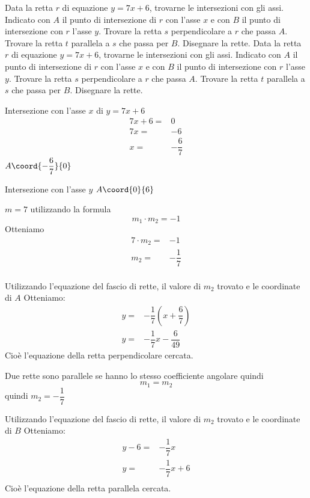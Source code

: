 \begin{exercise}
Data la retta $r$ di equazione $y=7x+6$, trovarne le intersezioni con gli assi. Indicato con $A$ il punto di intersezione di $r$ con l'asse $x$ e con $B$ il punto di intersezione con $r$ l'asse $y$. Trovare la retta $s$ perpendicolare a $r$ che passa $A$.
Trovare la retta $t$ parallela a $s$ che passa per $B$. Disegnare la rette.
\tcblower
Data la retta $r$ di equazione $y=7x+6$, trovarne le intersezioni con gli assi. Indicato con $A$ il punto di intersezione di $r$ con l'asse $x$ e con $B$ il punto di intersezione con $r$ l'asse $y$. Trovare la retta $s$ perpendicolare a $r$ che passa $A$.
Trovare la retta $t$ parallela a $s$ che passa per $B$. Disegnare la rette.
	
Intersezione con l'asse $x$ di $y=7x+6$
\begin{align*}
7x+6=&0\\
7x=&-6\\
x=&-\dfrac{6}{7}
\end{align*}
 $A\coord{-\dfrac{6}{7}}{0}$
 
 Intersezione con l'asse $y$
  $A\coord{0}{6}$
 
 	$m=7$ utilizzando la formula \[m_1\cdot m_2=-1\] Otteniamo
 	\begin{align*}
 	7\cdot m_2=&-1\\
 	m_2=&-\dfrac{1}{7}\\
 \end{align*}
 
 	Utilizzando l'equazione del fascio di rette, il valore di $m_2$ trovato e le coordinate di $A$ Otteniamo:
 	\begin{align*}
 	y=&-\dfrac{1}{7}(x+\dfrac{6}{7})\\
 	y=&-\dfrac{1}{7}x-\dfrac{6}{49}
 	\end{align*}
 	Cioè l'equazione della retta perpendicolare cercata.
 	
	Due rette sono parallele se hanno lo stesso coefficiente angolare quindi \[m_1=m_2 \]
	quindi $m_2=-\dfrac{1}{7}$ 
	
	Utilizzando l'equazione del fascio di rette, il valore di $m_2$ trovato e le coordinate di $B$ Otteniamo:
	\begin{align*}
	y-6=&-\dfrac{1}{7}x\\
	y=&-\dfrac{1}{7}x+6\\
	\end{align*}
	Cioè l'equazione della retta parallela cercata.	
		\begin{center}
			
		\end{center} 	
\end{exercise}
